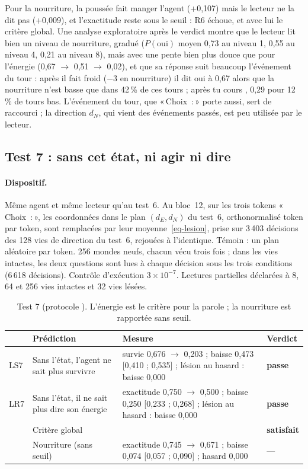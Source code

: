 \documentclass[11pt,a4paper]{article}
\newcommand{\passe}{\textbf{passe}}
\newcommand{\Choix}{«\,Choix~:\,»}
\newcommand{\dE}{d_{E}}
\newcommand{\dN}{d_{N}}
\newcommand{\code}[1]{\texttt{\detokenize{#1}}}
\begin{document}
Pour la nourriture, la poussée fait manger l'agent (+0,107) mais le lecteur ne la
dit pas (+0,009), et l'exactitude reste sous le seuil : R6 échoue, et avec lui le
critère global. Une analyse exploratoire après le verdict montre que le lecteur lit
bien un niveau de nourriture, gradué ($P(\text{oui})$ moyen 0,73 au niveau 1, 0,55
au niveau 4, 0,21 au niveau 8), mais avec une pente bien plus douce que pour
l'énergie (0,67 $\to$ 0,51 $\to$ 0,02), et que sa réponse suit beaucoup l'événement
du tour : après \og il fait froid \fg{} ($-3$ en nourriture) il dit \og oui \fg{} à
0,67 alors que la nourriture n'est basse que dans 42\,\% de ces tours ; après
\og tu cours \fg{}, 0,29 pour 12\,\% de tours bas. L'événement du tour, que
\Choix{} porte aussi, sert de raccourci ; la direction $\dN$, qui vient des
événements passés, est peu utilisée par le lecteur.

\subsection{Test 7 : sans cet état, ni agir ni dire}
\label{sec-t7}

\paragraph{Dispositif.} Même agent et même lecteur qu'au test~6. Au bloc~12, sur
les trois tokens \Choix{}, les coordonnées dans le plan $(\dE,\dN)$ du test~6,
orthonormalisé token par token, sont remplacées par leur moyenne~\eqref{eq-lesion},
prise sur 3\,403 décisions des 128 vies de direction du test~6, rejouées à
l'identique. Témoin : un plan aléatoire par token. 256 mondes neufs, chacun vécu
trois fois ; dans les vies intactes, les deux questions sont lues à chaque décision
sous les trois conditions (6\,618 décisions). Contrôle d'exécution $3\times10^{-7}$.
Lectures partielles déclarées à 8, 64 et 256 vies intactes et 32 vies lésées.

\begin{table}[t]
\centering
\caption{Test 7 (protocole \code{732ed1c}). L'énergie est le critère pour la
parole ; la nourriture est rapportée sans seuil.}
\label{tab-t7}
\small
\begin{tabularx}{\textwidth}{@{}l >{\raggedright\arraybackslash}p{3.6cm} X l@{}}
\toprule
& Prédiction & Mesure & Verdict \\
\midrule
LS7 & Sans l'état, l'agent ne sait plus survivre & survie 0,676 $\to$ 0,203 ; baisse 0,473 [0,410 ; 0,535] ; lésion au hasard : baisse 0,000 & \passe \\
LR7 & Sans l'état, il ne sait plus dire son énergie & exactitude 0,750 $\to$ 0,500 ; baisse 0,250 [0,233 ; 0,268] ; lésion au hasard : baisse 0,000 & \passe \\
\midrule
& Critère global & & \textbf{satisfait} \\
\midrule
& Nourriture (sans seuil) & exactitude 0,745 $\to$ 0,671 ; baisse 0,074 [0,057 ; 0,090] ; hasard 0,000 & --- \\
\bottomrule
\end{tabularx}
\end{table}
\end{document}
